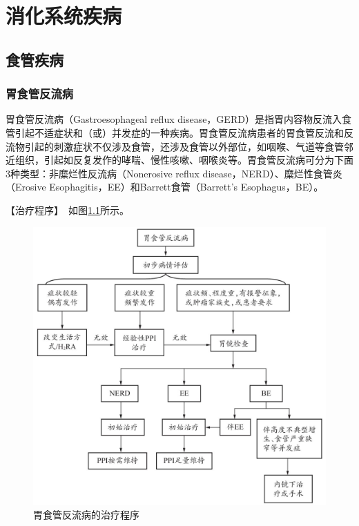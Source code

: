 \chapter{消化系统疾病}

\section{食管疾病}

\subsection{胃食管反流病}

胃食管反流病（Gastroesophageal reflux
disease，GERD）是指胃内容物反流入食管引起不适症状和（或）并发症的一种疾病。胃食管反流病患者的胃食管反流和反流物引起的刺激症状不仅涉及食管，还涉及食管以外部位，如咽喉、气道等食管邻近组织，引起如反复发作的哮喘、慢性咳嗽、咽喉炎等。胃食管反流病可分为下面3种类型：非糜烂性反流病（Nonerosive
reflux disease，NERD）、糜烂性食管炎（Erosive
Esophagitis，EE）和Barrett食管（Barrett's Esophagus，BE）。

【治疗程序】　如图\ref{fig3-1-1}所示。

\begin{figure}[!htbp]
 \centering
 \includegraphics{./images/Image00085.jpg}
 \captionsetup{justification=centering}
 \caption{胃食管反流病的治疗程序}
 \label{fig3-1-1}
  \end{figure} 

